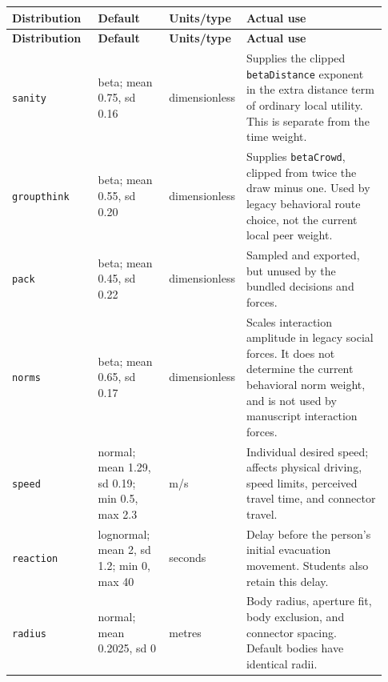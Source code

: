 \documentclass[11pt]{article}
\begin{document}
{\small\setlength{\tabcolsep}{4pt}

\begin{longtable}{@{}p{0.23\linewidth}p{0.19\linewidth}p{0.13\linewidth}p{0.38\linewidth}@{}}

\toprule

\textbf{Distribution} & \textbf{Default} & \textbf{Units/type} & \textbf{Actual use} \\

\midrule\endfirsthead

\toprule

\textbf{Distribution} & \textbf{Default} & \textbf{Units/type} & \textbf{Actual use} \\

\midrule\endhead

\bottomrule\endfoot

\texttt{sanity} & beta; mean 0.75, sd 0.16 & dimensionless & Supplies the clipped \texttt{beta\allowbreak{}Distance} exponent in the extra distance term of ordinary local utility. This is separate from the time weight. \\

\texttt{groupthink} & beta; mean 0.55, sd 0.20 & dimensionless & Supplies \texttt{beta\allowbreak{}Crowd}, clipped from twice the draw minus one. Used by legacy behavioral route choice, not the current local peer weight. \\

\texttt{pack} & beta; mean 0.45, sd 0.22 & dimensionless & Sampled and exported, but unused by the bundled decisions and forces. \\

\texttt{norms} & beta; mean 0.65, sd 0.17 & dimensionless & Scales interaction amplitude in legacy social forces. It does not determine the current behavioral norm weight, and is not used by manuscript interaction forces. \\

\texttt{speed} & normal; mean 1.29, sd 0.19; min 0.5, max 2.3 & m/s & Individual desired speed; affects physical driving, speed limits, perceived travel time, and connector travel. \\

\texttt{reaction} & lognormal; mean 2, sd 1.2; min 0, max 40 & seconds & Delay before the person's initial evacuation movement. Students also retain this delay. \\

\texttt{radius} & normal; mean 0.2025, sd 0 & metres & Body radius, aperture fit, body exclusion, and connector spacing. Default bodies have identical radii. \\


\end{longtable}}
\end{document}
